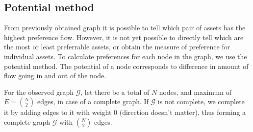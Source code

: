 \documentclass[letterpaper, 10pt, conference]{ieeeconf}
\newcommand{\graph}[1]{\mathcal{#1}}
\begin{document}
%  

  
   
  \subsection{Potential method}
  \label{sub:potential}
  From previously obtained graph it is possible to tell which pair of assets has the highest preference flow.
  However, it is not yet possible to directly tell which are the most or least preferrable assets, or obtain the measure of preference for individual assets.
  To calculate preferences for each node in the graph, we use the potential method\cite{caklovic}.
  The potential of a node corresponds to difference in amount of flow going in and out of the node.
  
    For the observed graph $\graph{G}$, let there be a total of $N$ nodes, and maximum of $E = \binom{N}{2}$ edges, in case of a complete graph.
    If $\graph{G}$ is not complete, we complete it by adding edges to it with weight 0 (direction doesn't matter),
    thus forming a complete graph $\graph{G}$ with $\binom{N}{2}$ edges.
    
\end{document}
